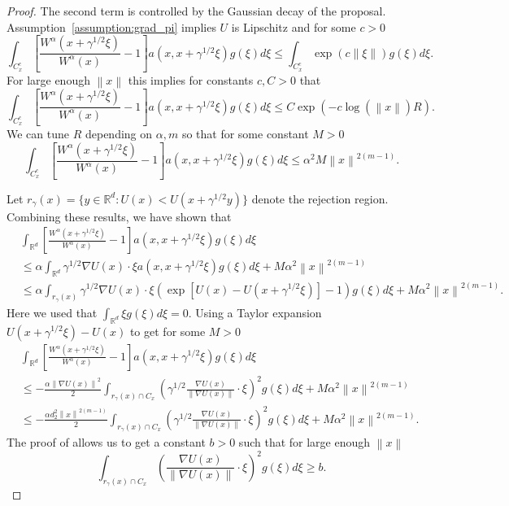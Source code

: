 \documentclass[12pt]{article}
\theoremstyle{plain}
\theoremstyle{remark}
\newcommand{\norm}[1]{\left\lVert#1\right\rVert}
\newcommand{\R}{\mathbb{R}}
\newcommand{\eq}[1]{\begin{align*}#1\end{align*}}
\begin{document}
\begin{proof}
The second term is controlled by the Gaussian decay of the proposal.
Assumption~\ref{assumption:grad_pi} implies $U$ is Lipschitz and for some $c > 0$
\[
\int_{C_x^c} \left[ \frac{ W^\alpha(x +  \gamma^{1/2} \xi) }{ W^\alpha(x) } - 1 \right] a( x, x + \gamma^{1/2} \xi )g(\xi) d\xi
\le \int_{C_x^c} \exp( c \norm{\xi} ) g(\xi) d\xi.
\]
For large enough $\norm{x}$ this implies for constants $c, C > 0$ that
\[
\int_{C_x^c} \left[ \frac{ W^\alpha(x +  \gamma^{1/2} \xi) }{ W^\alpha(x) } - 1 \right] a( x, x + \gamma^{1/2} \xi )g(\xi) d\xi
\le C \exp( - c \log(\norm{x}) R  ).
\]
We can tune $R$ depending on $\alpha, m$ so that for some constant $M > 0$
\[
\int_{C_x^c} \left[ \frac{ W^\alpha(x +  \gamma^{1/2} \xi) }{ W^\alpha(x) } - 1 \right] a( x, x + \gamma^{1/2} \xi )g(\xi) d\xi
\le \alpha^2 M \norm{x}^{2(m - 1)}.
\]

Let $r_\gamma(x) = \{ y \in \R^d : U(x) < U(x + \gamma^{1/2} y) \}$ denote the rejection region.
Combining these results, we have shown that
\eq{
&\int_{\R^d} \left[ \frac{ W^\alpha(x +  \gamma^{1/2} \xi) }{ W^\alpha(x) } - 1 \right] a( x, x + \gamma^{1/2} \xi )g(\xi) d\xi
\\
&\le \alpha \int_{\R^d} \gamma^{1/2} \nabla U(x) \cdot \xi a(x, x + \gamma^{1/2} \xi) g(\xi) d\xi
+ M \alpha^2 \norm{x}^{2(m - 1)}
\\
&\le \alpha \int_{r_\gamma(x) } \gamma^{1/2} \nabla U(x) \cdot \xi \left( \exp[ U(x) - U(x + \gamma^{1/2} \xi) ] - 1 \right) g(\xi) d\xi
+ M \alpha^2 \norm{x}^{2(m - 1)}.
}
Here we used that $\int_{\R^d} \xi g(\xi) d\xi = 0$.
Using a Taylor expansion $U(x + \gamma^{1/2} \xi) - U(x)$ to get for some $M > 0$
\eq{
&\int_{\R^d} \left[ \frac{ W^\alpha(x +  \gamma^{1/2} \xi) }{ W^\alpha(x) } - 1 \right] a( x, x + \gamma^{1/2} \xi )g(\xi) d\xi
\\
&\le -\frac{\alpha \norm{\nabla U(x)}^2}{2} \int_{r_\gamma(x) \cap C_x } \left( \gamma^{1/2} \frac{\nabla U(x)}{\norm{\nabla U(x)}} \cdot \xi \right)^2 g(\xi) d\xi
+ M \alpha^2 \norm{x}^{2(m - 1)}
\\
&\le -\frac{ \alpha d_2^2 \norm{x}^{2 (m - 1)}}{2} \int_{r_\gamma(x) \cap C_x } \left( \gamma^{1/2} \frac{\nabla U(x)}{\norm{\nabla U(x)}} \cdot \xi \right)^2 g(\xi) d\xi
+ M \alpha^2 \norm{x}^{2(m - 1)}.
}
The proof of \citep[Lemma B.3]{fort:moulines:2000} allows us to get a constant $b > 0$ such that for large enough $\norm{x}$
\[
\int_{r_\gamma(x) \cap C_x} \left( \frac{\nabla U(x)}{\norm{\nabla U(x)}} \cdot \xi \right)^2 g(\xi) d\xi
\ge b.
\]


\end{proof}
\end{document}
